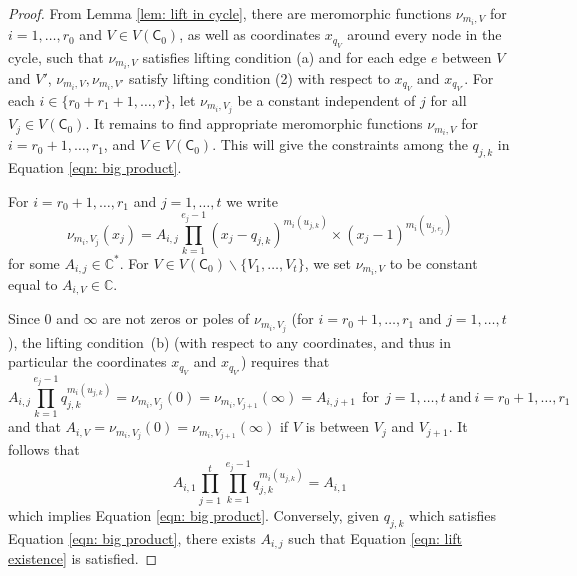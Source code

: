 \documentclass{article}
\def\C{\mathbb{C}}
\newcommand{\tropC}{\mathsf{C}}
\begin{document}
\begin{proof}
    
     From Lemma \ref{lem: lift in cycle}, there are meromorphic functions $\nu_{m_i, V}$ for $i = 1, \ldots, r_0$ and $V \in V(\tropC_0)$, as well as coordinates $x_{q_V}$ around every node in the cycle, such that $\nu_{m_i,V}$ satisfies lifting condition (a) and for each edge $e$ between $V$ and $V'$, $\nu_{m_i,V}, \nu_{m_i,V'}$ satisfy lifting condition (2) with respect to $x_{q_V}$ and $x_{q_{V'}}$. 
     For each $i \in \{r_0+r_1 +1, \ldots, r\}$, let $\nu_{m_i, V_j}$ be a constant independent of $j$ for all $V_j \in V(\tropC_0)$. It remains to find appropriate meromorphic functions $\nu_{m_i,V}$ for $i = r_0+1, \ldots, r_1$, and $V \in V(\tropC_0)$. This will give the constraints among the $q_{j,k}$ in Equation \eqref{eqn: big product}.  


    

    For $i = r_0+1, \ldots, r_1$ and $j=1,\ldots,t$ we write
    \begin{equation*}\label{eqn: lifting equation}
        \nu_{m_i, V_j}(x_j) = A_{i,j} \prod_{k=1}^{e_j-1} (x_j-q_{j,k})^{m_i(u_{j,k})} \times (x_j-1)^{m_i(u_{j,e_j})}
    \end{equation*}
    for some $A_{i,j} \in \mathbb{C}^*$. For $V \in V(\tropC_0) \smallsetminus \{V_1,\ldots,V_t\}$, we set $\nu_{m_i, V}$ to be constant equal to $A_{i,V} \in \C$. 
    
    Since $0$ and $\infty$ are not zeros or poles of $\nu_{m_i,V_j}$ (for $i = r_0+1, \ldots, r_1$ and $j=1,\ldots,t$), the lifting condition~(b) (with respect to any coordinates, and thus in particular the coordinates $x_{q_V}$ and $x_{q_{V'}}$) requires that 
    \begin{equation} \label{eqn: lift existence}
        A_{i,j} \prod_{k=1}^{e_j-1} q_{j,k}^{m_i(u_{j,k})} = \nu_{m_i, V_j}(0) = \nu_{m_i, V_{j+1}}(\infty) = A_{i,j+1} \ \  \text{for} \ \ j=1,\ldots,t \ \text{and} \ i=r_0+1,\ldots, r_1
    \end{equation}
    and that $A_{i,V}= \nu_{m_{i}, V_j}(0)= \nu_{m_{i}, V_{j+1}}(\infty)$ if $V$ is between $V_j$ and $V_{j+1}$.
    It follows that 
    \begin{equation*} 
        A_{i,1} \prod_{j = 1}^t \prod_{k=1}^{e_j -1} q_{j,k}^{m_i(u_{j,k})} = A_{i,1}
    \end{equation*}
    which implies Equation \eqref{eqn: big product}. 
    Conversely, given $q_{j,k}$ which satisfies Equation \eqref{eqn: big product}, there exists $A_{i,j}$ such that Equation \eqref{eqn: lift existence} is satisfied. 

\end{proof}
\end{document}
